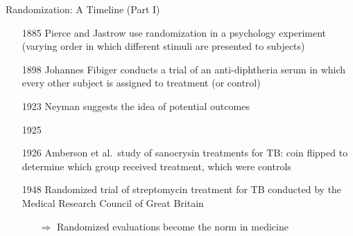 \documentclass[10pt,xcolor=table,ignorenonframetext,handout,aspectratio=169]{beamer}
\newlength{\wideitemsep}
\let\olditem\item
\renewcommand{\item}{\setlength{\itemsep}{\wideitemsep}\olditem}
\begin{document}

\begin{frame}{Randomization:  A Timeline (Part I)}

\medskip
\begin{small}
	\begin{itemize}
		
		\item[1885] Pierce and Jastrow use randomization in a psychology experiment (varying order in which different stimuli are presented to subjects)
		
		\item[1898] Johannes Fibiger conducts a trial of an anti-diphtheria serum in which every other subject is assigned to treatment (or control)
		
		\item[1923] Neyman suggests the idea of potential outcomes
		
		\item[1925]  \\
		
		\item[1926] Amberson et al.~study of sanocrysin treatments for TB:  coin flipped to determine which group received treatment, which were controls
		
		\item[1948] Randomized trial of streptomycin treatment for TB conducted by the Medical Research Council of Great Britain
		
		\medskip
		\begin{itemize}
			
			\item[$\Rightarrow$] Randomized evaluations become the norm in medicine
			
		\end{itemize}
		
		
		
	\end{itemize}
\end{small}

\end{frame}
\end{document}
